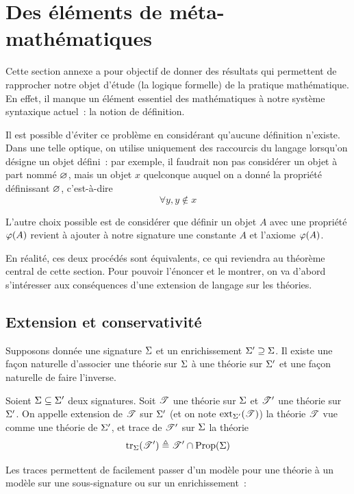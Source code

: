 \section{Des éléments de méta-mathématiques}\label{sec.metamath}

Cette section annexe a pour objectif de donner des résultats qui permettent de
rapprocher notre objet d'étude (la logique formelle) de la pratique
mathématique.
En effet, il manque un élément essentiel des mathématiques à notre système
syntaxique actuel~: la notion de définition.

Il est possible d'éviter ce problème en considérant qu'aucune définition
n'existe.
Dans une telle optique, on utilise uniquement des raccourcis du langage
lorsqu'on désigne un objet défini~: par exemple, il faudrait non pas considérer
un objet à part nommé $\varnothing$, mais un objet $x$ quelconque auquel on a donné
la propriété définissant $\varnothing$, c'est-à-dire
\[\forall y, y \notin x\]

L'autre choix possible est de considérer que définir un objet $A$ avec une
propriété $\varphi(A)$ revient à ajouter à notre signature une constante
$A$ et l'axiome $\varphi(A)$.

En réalité, ces deux procédés sont équivalents, ce qui reviendra au théorème
central de cette section. Pour pouvoir l'énoncer et le montrer, on va d'abord
s'intéresser aux conséquences d'une extension de langage sur les théories.

\subsection{Extension et conservativité}

Supposons donnée une signature $\Sigma$ et un enrichissement
$\Sigma' \supseteq \Sigma$.
Il existe une façon naturelle d'associer une théorie sur $\Sigma$ à une théorie
sur $\Sigma'$ et une façon naturelle de faire l'inverse.

\begin{definition}
  Soient $\Sigma\subseteq \Sigma'$ deux signatures. Soit $\mathscr T$ une théorie sur
  $\Sigma$ et $\mathscr T'$ une théorie sur $\Sigma'$. On appelle extension de $\mathscr T$
  sur $\Sigma'$ (et on note $\operatorname{ext}_{\Sigma'}(\mathscr T)$)
  la théorie $\mathscr T$ vue comme une théorie de $\Sigma'$, et
  trace de $\mathscr T'$ sur $\Sigma$ la théorie
  \[\operatorname{tr}_{\Sigma}(\mathscr T') \triangleq \mathscr T' \cap \operatorname{Prop}(\Sigma)\]
\end{definition}

Les traces permettent de facilement passer d'un modèle pour une théorie à un
modèle sur une sous-signature ou sur un enrichissement~:


